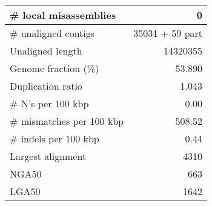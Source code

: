 \documentclass[12pt,a4paper]{article}
\begin{document}
\begin{table}[ht]
\begin{center}
\begin{tabular}{|l*{1}{|r}|}
\# local misassemblies & 0 \\ \hline
\# unaligned contigs & 35031 + 59 part \\ \hline
Unaligned length & 14320355 \\ \hline
Genome fraction (\%) & 53.890 \\ \hline
Duplication ratio & 1.043 \\ \hline
\# N's per 100 kbp & 0.00 \\ \hline
\# mismatches per 100 kbp & 508.52 \\ \hline
\# indels per 100 kbp & 0.44 \\ \hline
Largest alignment & 4310 \\ \hline
NGA50 & 663 \\ \hline
LGA50 & 1642 \\ \hline
\end{tabular}
\end{center}
\end{table}
\end{document}
